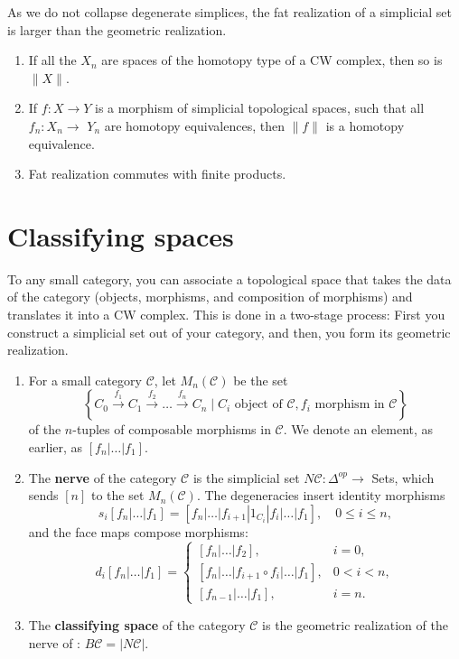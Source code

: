 As we do not collapse degenerate simplices, the fat realization of a simplicial set is larger than the geometric realization.
\begin{prop}
    \begin{enumerate}
        \item If all the $X_n$ are spaces of the homotopy type of a CW complex, then so is $\|X\|$.
        \item If $f: X \rightarrow Y$ is a morphism of simplicial topological spaces, such that all $f_n: X_n \rightarrow$ $Y_n$ are homotopy equivalences, then $\|f\|$ is a homotopy equivalence.
        \item Fat realization commutes with finite products.
    \end{enumerate}
\end{prop}



\section{Classifying spaces}

To any small category, you can associate a topological space that takes the data of the category (objects, morphisms, and composition of morphisms) and translates it into a CW complex. This is done in a two-stage process: First you construct a simplicial set out of your category, and then, you form its geometric realization.

\begin{enumerate}
    \item For a small category $\mathcal{C}$, let $M_n(\mathcal{C})$ be the set
    $$
    \left\{C_0 \xrightarrow{f_1} C_1 \xrightarrow{f_2} \ldots \xrightarrow{f_n} C_n \mid C_i \text { object of } \mathcal{C}, f_i \text { morphism in } \mathcal{C}\right\}
    $$
    of the $n$-tuples of composable morphisms in $\mathcal{C}$. We denote an element, as earlier, as $\left[f_n|\ldots| f_1\right]$.
    \item The \textbf{nerve} of the category $\mathcal{C}$ is the simplicial set $N \mathcal{C}: \Delta^{o p} \rightarrow$ Sets, which sends $[n]$ to the set $M_n(\mathcal{C})$. The degeneracies insert identity morphisms
    $$
    s_i\left[f_n|\ldots| f_1\right]=\left[f_n|\ldots| f_{i+1}\left|1_{C_i}\right| f_i|\ldots| f_1\right], \quad 0 \leq i \leq n,
    $$
    and the face maps compose morphisms:
    $$
    d_i\left[f_n|\ldots| f_1\right]= \begin{cases}{\left[f_n|\ldots| f_2\right],} & i=0, \\ {\left[f_n|\ldots| f_{i+1} \circ f_i|\ldots| f_1\right],} & 0<i<n, \\ {\left[f_{n-1}|\ldots| f_1\right],} & i=n .\end{cases}
    $$
    \item The \textbf{classifying space} of the category $\mathcal{C}$ is the geometric realization of the nerve of \cc: $B \mathcal{C}=|N \mathcal{C}|$.
\end{enumerate}

